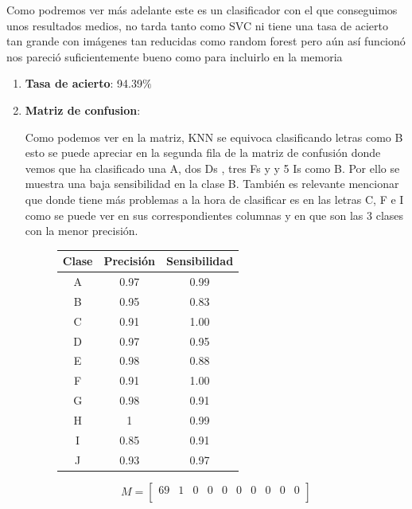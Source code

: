 \documentclass[8pt,a4paper]{{esannV2}}
\begin{document}
Como podremos ver más adelante este es un clasificador con el que conseguimos unos resultados medios, no tarda tanto como SVC ni tiene una tasa de acierto tan grande con imágenes tan reducidas como random forest pero aún así funcionó nos pareció suficientemente bueno como para incluirlo en la memoria
\begin{enumerate}
\item \textbf{Tasa de acierto}: 94.39$\%$

\item \textbf{Matriz de confusion}:
	
Como podemos ver en la matriz, KNN se equivoca clasificando letras como B esto se puede apreciar en la segunda fila de la matriz de confusión donde vemos que ha clasificado una A, dos Ds , tres Fs y y 5 Is como B. Por ello se muestra una baja sensibilidad en la clase B. También es relevante mencionar que donde tiene más problemas a la hora de clasificar es en las letras C, F e I como se puede ver en sus correspondientes columnas y en que son las 3 clases con la menor precisión.
\begin{figure}[h!]
\centering
\begin{minipage}{.5\textwidth}
    \begin{tabular}{|c|c|c|} %
    \hline
      \textbf{Clase} & \textbf{Precisión} & \textbf{Sensibilidad}\\
      \hline
      A & 0.97 & 0.99\\
      \hline
      B & 0.95 & 0.83\\
      \hline
      C & 0.91 & 1.00\\
      \hline
      D & 0.97 & 0.95\\
      \hline
      E & 0.98 & 0.88\\
      \hline
      F & 0.91 & 1.00\\
      \hline
      G & 0.98 & 0.91\\
      \hline
      H & 1    & 0.99\\
      \hline
      I & 0.85 & 0.91\\
      \hline
      J & 0.93 & 0.97\\
      \hline
    \end{tabular}
\end{minipage}%
\begin{minipage}{.5\textwidth}
\[
M=
  \begin{bmatrix}
    69 & 1 & 0 & 0 & 0 & 0 & 0 & 0 & 0 & 0 \\

\end{bmatrix}\]
\end{minipage}
\end{figure}
\end{enumerate}
\end{document}
